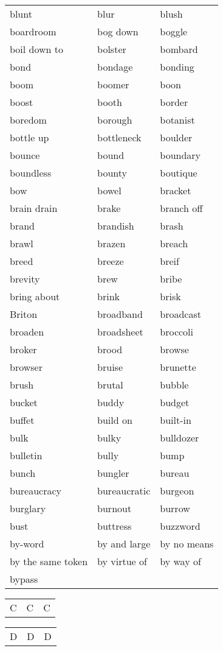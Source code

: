 \documentclass{minimal}
\begin{document}
\begin{longtable}{p{2.8cm}p{2.8cm}p{2.8cm}}
blunt & blur & blush \\
boardroom & bog down & boggle \\
boil down to & bolster & bombard \\
bond & bondage & bonding \\
boom & boomer & boon \\
boost & booth & border \\
boredom & borough & botanist \\
bottle up & bottleneck & boulder \\
bounce & bound & boundary \\
boundless & bounty & boutique \\
bow & bowel & bracket \\
brain drain & brake & branch off \\
brand & brandish & brash \\
brawl & brazen & breach \\
breed & breeze & breif \\
brevity & brew & bribe \\
bring about & brink & brisk \\
Briton & broadband & broadcast \\
broaden & broadsheet & broccoli \\
broker & brood & browse \\
browser & bruise & brunette \\
brush & brutal & bubble \\
bucket & buddy & budget \\
buffet & build on & built-in \\
bulk & bulky & bulldozer \\
bulletin & bully & bump \\
bunch & bungler & bureau \\
bureaucracy & bureaucratic & burgeon \\
burglary & burnout & burrow \\
bust & buttress & buzzword \\
by-word & by and large & by no means \\
by the same token & by virtue of & by way of \\
bypass
\end{longtable}

\begin{longtable}{p{2.8cm}p{2.8cm}p{2.8cm}}
C & C & C
\end{longtable}

\begin{longtable}{p{2.8cm}p{2.8cm}p{2.8cm}}
D & D & D
\end{longtable}
\end{document}
